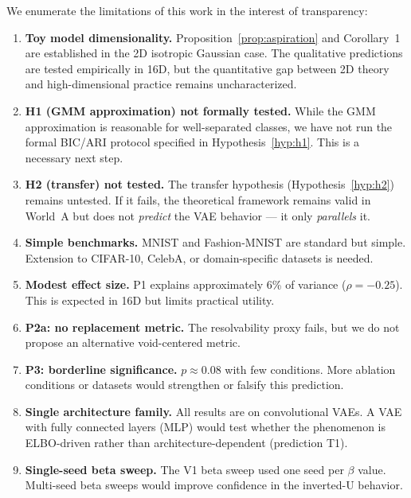 \documentclass[11pt]{article}
\begin{document}
We enumerate the limitations of this work in the interest of transparency:

\begin{enumerate}
\item \textbf{Toy model dimensionality.}
Proposition~\ref{prop:aspiration} and Corollary~1 are established in the
2D isotropic Gaussian case.
The qualitative predictions are tested empirically in 16D, but the
quantitative gap between 2D theory and high-dimensional practice remains
uncharacterized.

\item \textbf{H1 (GMM approximation) not formally tested.}
While the GMM approximation is reasonable for well-separated classes,
we have not run the formal BIC/ARI protocol specified in
Hypothesis~\ref{hyp:h1}.
This is a necessary next step.

\item \textbf{H2 (transfer) not tested.}
The transfer hypothesis (Hypothesis~\ref{hyp:h2}) remains untested.
If it fails, the theoretical framework remains valid in World~A but does
not \emph{predict} the VAE behavior --- it only \emph{parallels} it.

\item \textbf{Simple benchmarks.}
MNIST and Fashion-MNIST are standard but simple.
Extension to CIFAR-10, CelebA, or domain-specific datasets is needed.

\item \textbf{Modest effect size.}
P1 explains approximately 6\% of variance ($\rho = -0.25$).
This is expected in 16D but limits practical utility.

\item \textbf{P2a: no replacement metric.}
The resolvability proxy fails, but we do not propose an alternative
void-centered metric.

\item \textbf{P3: borderline significance.}
$p \approx 0.08$ with few conditions.
More ablation conditions or datasets would strengthen or falsify this
prediction.

\item \textbf{Single architecture family.}
All results are on convolutional VAEs.
A VAE with fully connected layers (MLP) would test whether the phenomenon
is ELBO-driven rather than architecture-dependent (prediction T1).

\item \textbf{Single-seed beta sweep.}
The V1 beta sweep used one seed per $\beta$ value.
Multi-seed beta sweeps would improve confidence in the inverted-U behavior.
\end{enumerate}
\end{document}
